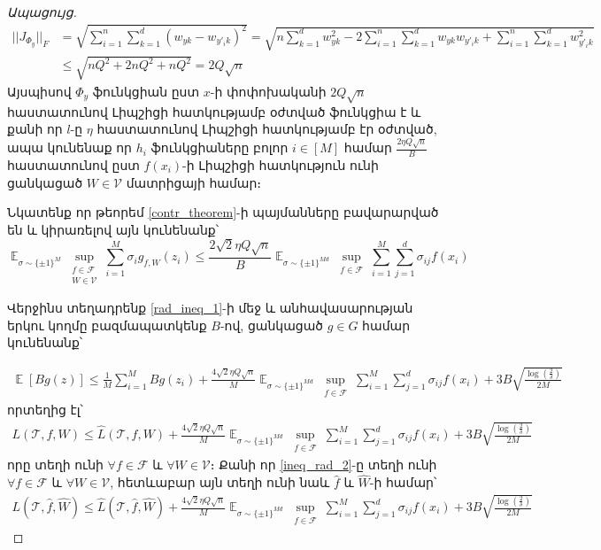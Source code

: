 \documentclass[11pt]{article}
\DeclareMathOperator*{\E}{\mathbb{E}}
\begin{document}
\begin{proof}[Ապացույց]
\begin{align*}
||J_{\Phi_y}||_F &= \sqrt{\sum_{i = 1}^n \sum_{k = 1}^d    \left(w_{yk} - w_{y'_ik}\right)^2} = \sqrt{n\sum_{k =1}^d w^2_{yk}   - 2 \sum_{i=1}^n \sum_{k=1}^d w_{yk} w_{y'_ik}  + \sum_{i=1}^n \sum_{k=1}^d  w^2_{y'_ik} } \\
&\leq  \sqrt{nQ^2+2nQ^2+nQ^2} = 2Q\sqrt{n}
\end{align*}
Այսպիսով $\Phi_y$ ֆունկցիան  ըստ $x$-ի փոփոխականի $2Q\sqrt{n}$ հաստատունով Լիպշիցի հատկությամբ օժտված ֆունկցիա է և քանի որ $l$-ը $\eta$ հաստատունով Լիպշիցի հատկությամբ էր օժտված, ապա կունենաք որ $h_i$ ֆունկցիաները բոլոր $i \in [M]$ համար $\frac{2 \eta Q\sqrt{n}}{B}$ հաստատունով ըստ $f(x_i)$-ի Լիպշիցի հատկություն ունի ցանկացած $W \in \mathcal{V}$ մատրիցայի համար։


Նկատենք  որ թեորեմ  \ref{contr_theorem}-ի պայմանները բավարարված են և կիրառելով այն կունենանք՝
$$\E_{\sigma \sim \{\pm1\}^M} \sup_{\substack{ f  \in \mathcal{F}  \\ W \in \mathcal{V}}}\sum_{i=1}^M \sigma_ig_{f,W}(z_i) \leq  \frac{2\sqrt{2} \eta Q\sqrt{n}}{B}        \E_{\sigma \sim \{\pm1\}^{Md}} \sup_{\substack{ f  \in \mathcal{F}  }}\sum_{i=1}^M \sum_{j=1}^d \sigma_{ij}f(x_i)$$


Վերջինս տեղադրենք \ref{rad_ineq_1}-ի մեջ և անհավասարության երկու կողմը բազմապատկենք $B$-ով, ցանկացած $g \in G$ համար կունենանք՝

\begin{align*}
\E[Bg(z)] \leq \frac{1}{M}\sum_{i=1}^MBg(z_i) + \frac{4\sqrt{2} \eta Q\sqrt{n}}{M} \E_{\sigma \sim \{\pm1\}^{Md}} \sup_{\substack{ f  \in \mathcal{F}  }}\sum_{i=1}^M \sum_{j=1}^d \sigma_{ij}f(x_i)+    3B\sqrt{\frac{\log \left( \frac{2}{\delta} \right)}{2M}}
\end{align*}
որտեղից էլ՝
\begin{align}
\label{ineq_rad_2}
L(\mathcal{T}, f, W) \leq \hat{L}(\mathcal{T}, f, W) + \frac{4\sqrt{2} \eta Q\sqrt{n}}{M} \E_{\sigma \sim \{\pm1\}^{Md}} \sup_{\substack{ f  \in \mathcal{F}  }}\sum_{i=1}^M \sum_{j=1}^d \sigma_{ij}f(x_i)+    3B\sqrt{\frac{\log \left( \frac{2}{\delta} \right)}{2M}}
\end{align}
որը տեղի ունի $\forall f \in \mathcal{ F}$ և $\forall W \in \mathcal{V}$։ Քանի որ  \ref{ineq_rad_2}-ը տեղի ունի $\forall f \in \mathcal{ F}$ և $\forall W \in \mathcal{V}$, հետևաբար այն տեղի ունի նաև $\hat{f}$ և $\hat{W}$-ի համար՝
\begin{align}
\label{ineq_rad_3}
L(\mathcal{T}, \hat{f}, \hat{W}) \leq \hat{L}(\mathcal{T}, \hat{f}, \hat{W}) + \frac{4\sqrt{2} \eta Q\sqrt{n}}{M} \E_{\sigma \sim \{\pm1\}^{Md}} \sup_{\substack{ f  \in \mathcal{F}  }}\sum_{i=1}^M \sum_{j=1}^d \sigma_{ij}f(x_i)+    3B\sqrt{\frac{\log \left( \frac{2}{\delta} \right)}{2M}}
\end{align}


\end{proof}
\end{document}
